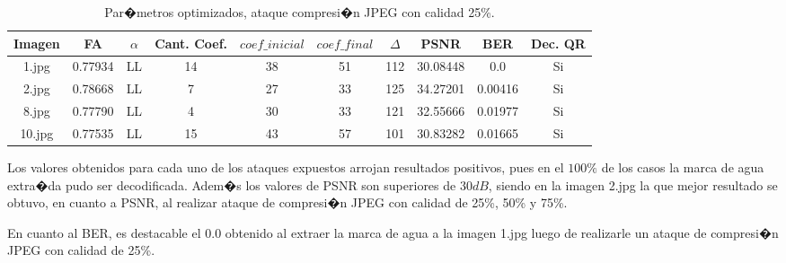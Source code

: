 \documentclass{rcci} %
\begin{document}
\begin{table}[H]
\centering
\begin{tabular}{|c|c|c|c|c|c|c|c|c|c|}
\hline
Imagen & FA & $\alpha$ & Cant. Coef. & $coef\_inicial$ & $coef\_final$ & $\Delta$ & PSNR & BER & Dec. QR \\\hline
1.jpg & 0.77934 & LL & 14 & 38 & 51 & 112 & 30.08448 & 0.0 & Si \\
2.jpg & 0.78668 & LL & 7 & 27 & 33 & 125 & 34.27201 & 0.00416 & Si \\
8.jpg & 0.77790 & LL & 4 & 30 & 33 & 121 & 32.55666 & 0.01977 & Si \\
10.jpg & 0.77535 & LL & 15 & 43 & 57 & 101 & 30.83282 & 0.01665 & Si \\\hline
\end{tabular}
\caption{Par�metros optimizados, ataque compresi�n JPEG con calidad 25\%.}
\end{table}

Los valores obtenidos para cada uno de los ataques expuestos arrojan resultados positivos, pues en el $100\%$
de los casos la marca de agua extra�da pudo ser decodificada. Adem�s los valores de PSNR son superiores de
$30dB$, siendo en la imagen 2.jpg la que mejor resultado se obtuvo, en cuanto a PSNR, al realizar ataque de compresi�n JPEG
con calidad de 25\%, 50\% y 75\%.

En cuanto al BER, es destacable el $0.0$ obtenido al extraer la marca de agua a la imagen 1.jpg luego de
realizarle un ataque de compresi�n JPEG con calidad de 25\%.
\end{document}
